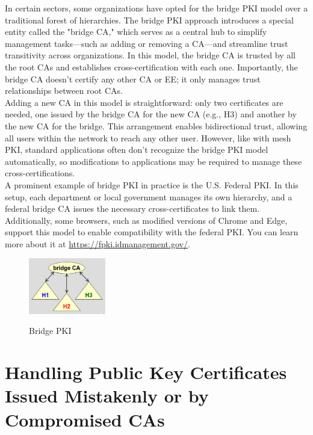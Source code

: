In certain sectors, some organizations have opted for the bridge PKI
model over a traditional forest of hierarchies. The bridge PKI
approach introduces a special entity called the "bridge CA," which
serves as a central hub to simplify management tasks—such as adding or
removing a CA—and streamline trust transitivity across organizations.
In this model, the bridge CA is trusted by all the root CAs and
establishes cross-certification with each one. Importantly, the bridge
CA doesn’t certify any other CA or EE; it only manages
trust relationships between root CAs.\\
Adding a new CA in this model is straightforward: only two
certificates are needed, one issued by the bridge CA for the new CA
(e.g., H3) and another by the new CA for the bridge. This arrangement
enables bidirectional trust, allowing all users within the network to
reach any other user. However, like with mesh PKI, standard
applications often don’t recognize the bridge PKI model automatically,
so modifications to applications may be required to manage these
cross-certifications.\\
A prominent example of bridge PKI in practice is the U.S. Federal PKI.
In this setup, each department or local government manages its own
hierarchy, and a federal bridge CA issues the necessary
cross-certificates to link them. Additionally, some browsers, such as
modified versions of Chrome and Edge, support this model to enable
compatibility with the federal PKI. You can learn more about it at
\url{https://fpki.idmanagement.gov/}.

\begin{figure}[H]
  \centering
  \includegraphics[width=0.3\textwidth]{img/x509 bridge pki.png}
  \label{fig:bridge PKI}

  \caption{Bridge PKI}
\end{figure}

\section*{Handling Public Key Certificates Issued Mistakenly or by
Compromised CAs}

